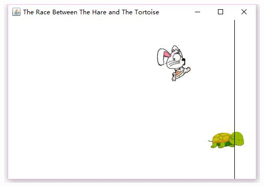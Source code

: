 \documentclass[11pt, a4paper]{article}
\begin{document}
\begin{CJK*}{UTF8}{gbsn}
  \begin{center}
    \includegraphics{result3.jpg}
  \end{center}
  
  \newpage

\end{CJK*}
\end{document}
